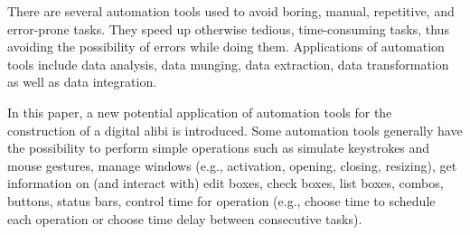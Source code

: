 \documentclass[runningheads]{llncs}
\begin{document}
%
%

There are several automation tools used to avoid boring, manual, repetitive, and
error-prone tasks.
They speed up otherwise tedious, time-consuming tasks,
thus avoiding the possibility of errors while doing them.
Applications of automation tools include data analysis, data munging, data
extraction, data transformation as well as data integration. %

In this paper, a new potential application of automation tools for the construction of a digital alibi is introduced.
Some automation tools generally have the possibility to perform simple operations such as simulate keystrokes and mouse gestures,
manage windows (e.g., activation, opening, closing, resizing),
get information on (and interact with) edit boxes, check boxes, list boxes, combos, buttons, status bars,
control time for operation (e.g., choose time to schedule each operation or choose time delay between consecutive tasks).
\end{document}
